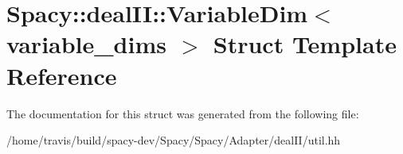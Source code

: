 \hypertarget{structSpacy_1_1dealII_1_1VariableDim}{\section{Spacy\-:\-:deal\-I\-I\-:\-:Variable\-Dim$<$ variable\-\_\-dims $>$ Struct Template Reference}
\label{structSpacy_1_1dealII_1_1VariableDim}
}


The documentation for this struct was generated from the following file\-:\begin{DoxyCompactItemize}
\item 
/home/travis/build/spacy-\/dev/\-Spacy/\-Spacy/\-Adapter/deal\-I\-I/util.\-hh\end{DoxyCompactItemize}
